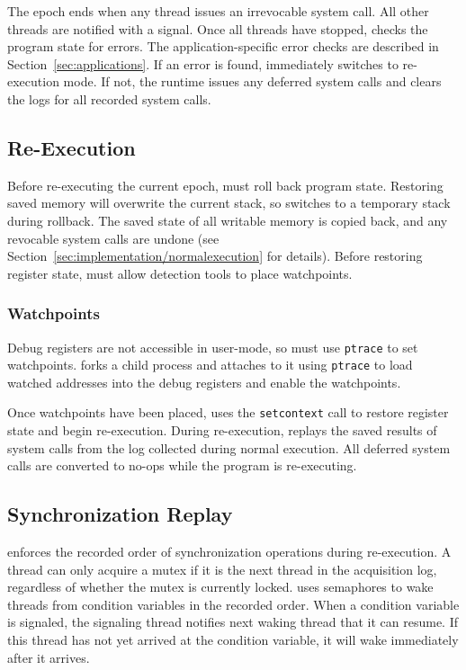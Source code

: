 The epoch ends when any thread issues an irrevocable system call. All other threads are notified with a signal. Once all threads have stopped, \doubletake{} checks the program state for errors. The application-specific error checks are described in Section~\ref{sec:applications}. If an error is found, \doubletake{} immediately switches to re-execution mode. If not, the runtime issues any deferred system calls and clears the logs for all recorded system calls.


\subsection{Re-Execution}
\label{sec:implementation/re-execution}

Before re-executing the current epoch, \doubletake{} must roll back program state. Restoring saved memory will overwrite the current stack, so \doubletake{} switches to a temporary stack during rollback. The saved state of all writable memory is copied back, and any revocable system calls are undone (see Section~\ref{sec:implementation/normalexecution} for details). Before restoring register state, \doubletake{} must allow detection tools to place watchpoints.

\subsubsection*{Watchpoints}
Debug registers are not accessible in user-mode, so \doubletake{} must use \texttt{ptrace} to set watchpoints. \doubletake{} forks a child process and attaches to it using \texttt{ptrace} to load watched addresses into the debug registers and enable the watchpoints.

Once watchpoints have been placed, \doubletake{} uses the \texttt{setcontext} call to restore register state and begin re-execution. During re-execution, \doubletake{} replays the saved results of system calls from the log collected during normal execution. All deferred system calls are converted to no-ops while the program is re-executing.

\subsection*{Synchronization Replay}
\doubletake{} enforces the recorded order of synchronization operations during re-execution. A thread can only acquire a mutex if it is the next thread in the acquisition log, regardless of whether the mutex is currently locked. \doubletake{} uses semaphores to wake threads from condition variables in the recorded order. When a condition variable is signaled, the signaling thread notifies next waking thread that it can resume. If this thread has not yet arrived at the condition variable, it will wake immediately after it arrives.
